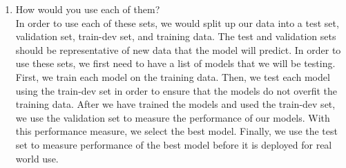 \documentclass[a4paper,10pt]{article}
\begin{document}
\begin{enumerate}
\begin{enumerate}
		\item How would you use each of them? \\
		In order to use each of these sets, we would split up our data into a test set, validation set, train-dev set, and training data.
		The test and validation sets should be representative of new data that the model will predict.
		In order to use these sets, we first need to have a list of models that we will be testing.
		First, we train each model on the training data.
		Then, we test each model using the train-dev set in order to ensure that the models do not overfit the training data.
		After we have trained the models and used the train-dev set, we use the validation set to measure the performance of our models.
		With this performance measure, we select the best model.
		Finally, we use the test set to measure performance of the best model before it is deployed for real world use.
	\end{enumerate}
\end{enumerate}
	
\end{document}
